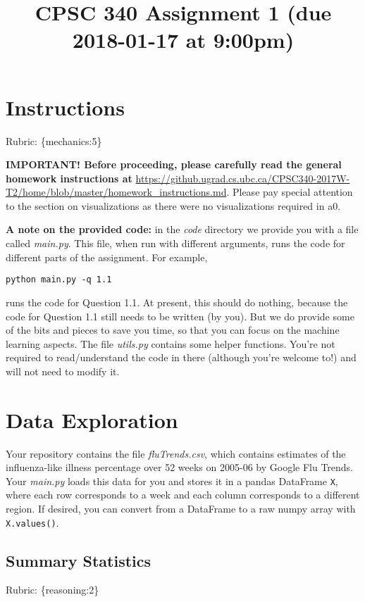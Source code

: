 \documentclass{article}
\def\gre#1{{\color{gre}#1}}
\def\rubric#1{\gre{Rubric: \{#1\}}}{}
\begin{document}
\title{CPSC 340 Assignment 1 (due 2018-01-17 at 9:00pm)}

\date{}
\maketitle

\vspace{-6em}

\section*{Instructions}
\rubric{mechanics:5}

\textbf{IMPORTANT! Before proceeding, please carefully read the general homework instructions at} \url{https://github.ugrad.cs.ubc.ca/CPSC340-2017W-T2/home/blob/master/homework_instructions.md}.
Please pay special attention to the section on visualizations as there were
no visualizations required in a0.

\textbf{A note on the provided code:} in the \emph{code} directory we provide you with a file called
\emph{main.py}. This file, when run with different arguments, runs the code for different
parts of the assignment. For example,
\begin{verbatim}
python main.py -q 1.1
\end{verbatim}
runs the code for Question 1.1. At present, this should do nothing, because the code
for Question 1.1 still needs to be written (by you). But we do provide some of the bits
and pieces to save you time, so that you can focus on the machine learning aspects.
The file \emph{utils.py} contains some helper functions.
You're not required to read/understand the code in there (although you're welcome to!) and will not need to modify it.


\section{Data Exploration}


Your repository contains the file \emph{fluTrends.csv}, which contains estimates
of the influenza-like illness percentage over 52 weeks on 2005-06 by Google Flu Trends.
Your \emph{main.py} loads this data for you and stores it in a pandas DataFrame \texttt{X},
where each row corresponds to a week and each column
corresponds to a different
region. If desired, you can convert from a DataFrame to a raw numpy array with \texttt{X.values()}.

\subsection{Summary Statistics}
\rubric{reasoning:2}
\end{document}
